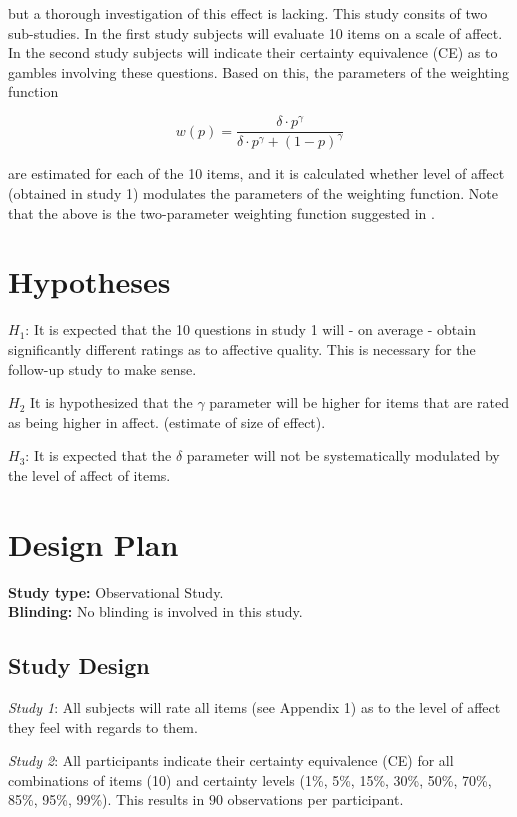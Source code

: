 \documentclass[12pt]{article}
\begin{document}
but a thorough investigation
of this effect is lacking. This study consits
of two sub-studies. In the first study subjects
will evaluate 10 items on a scale of affect.
In the second study subjects will indicate their
certainty equivalence (CE) as to gambles
involving these questions. Based on this, the
parameters of the weighting function

\[
	w(p) = \frac{\delta \cdot p^{\gamma}}
	{\delta \cdot p^{\gamma} + (1-p)^{\gamma}}
\]

are estimated for each of the 10 items, and it
is calculated whether level of affect (obtained in
study 1) modulates the parameters of the weighting
function. Note that the above is the two-parameter
weighting function
suggested in \autocite{gonzalez1999shape}.

\section{Hypotheses}

$H_1$: It is expected that the 10 questions in
study 1 will - on average - obtain significantly
different ratings as to affective quality.
This is necessary for the follow-up study to
make sense.

$H_2$ It is hypothesized that the $\gamma$
parameter will be higher for items that are
rated as being higher in affect.
(estimate of size of effect).

$H_3$: It is expected that the $\delta$
parameter will not be systematically
modulated by the level of affect of items.

\section{Design Plan}

\textbf{Study type:} Observational Study. \\

\textbf{Blinding:} No blinding is involved in this study. \\

\subsection{Study Design}

\emph{Study 1}: All subjects will rate all items
(see Appendix 1) as to the level of affect they
feel with regards to them.

\emph{Study 2}: All participants
indicate their certainty equivalence (CE) for all
combinations of items (10) and certainty levels
(1\%, 5\%, 15\%, 30\%, 50\%, 70\%, 85\%, 95\%, 99\%).
This results in $90$ observations per participant.
\end{document}
